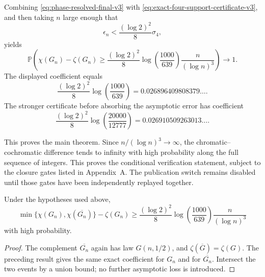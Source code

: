 Combining \eqref{eq:phase-resolved-final-v3} with
\eqref{eq:exact-four-support-certificate-v3}, and then taking $n$ large enough
that
\[
  \epsilon_n<\frac{(\log 2)^2}{8}\sigma_4,
\]
yields
\[
  \mathbb P\!\left(
    \chi(G_n)-\zeta(G_n)
    \ge
    \frac{(\log 2)^2}{8}
    \log\!\left(\frac{1000}{639}\right)
    \frac{n}{(\log n)^3}
  \right)
  \longrightarrow1.
\]
The displayed coefficient equals
\[
  \frac{(\log 2)^2}{8}
  \log\!\left(\frac{1000}{639}\right)
  =0.026896409808379\ldots.
\]
The stronger certificate before absorbing the asymptotic error has coefficient
\[
  \frac{(\log 2)^2}{8}
  \log\!\left(\frac{20000}{12777}\right)
  =0.026910509263013\ldots.
\]

\ifErdosProofClosed
This proves the main theorem. Since $n/(\log n)^3\to\infty$, the
chromatic--cochromatic difference tends to infinity with high probability
along the full sequence of integers.
\else
This proves the conditional verification statement, subject to the closure
gates listed in Appendix~A. The publication switch remains disabled until
those gates have been independently replayed together.
\fi

\begin{corollary}
Under the hypotheses used above,
\[
  \min\{\chi(G_n),\chi(\overline{G_n})\}-\zeta(G_n)
  \ge
  \frac{(\log 2)^2}{8}
  \log\!\left(\frac{1000}{639}\right)
  \frac{n}{(\log n)^3}
\]
with high probability.
\end{corollary}

\begin{proof}
The complement $\overline{G_n}$ again has law $G(n,1/2)$, and
$\zeta(\overline G)=\zeta(G)$. The preceding result gives the same exact
coefficient for $G_n$ and for $\overline{G_n}$. Intersect the two events by a
union bound; no further asymptotic loss is introduced.
\end{proof}
